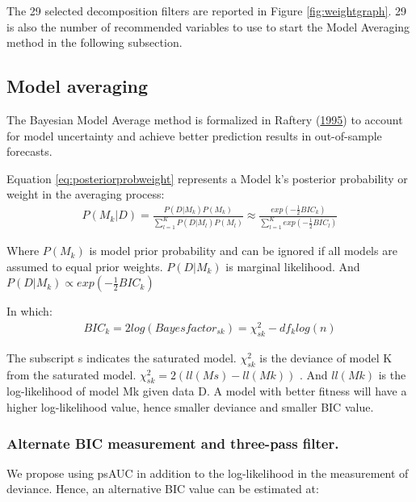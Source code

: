 \documentclass[
  12pt,
]{article}
\begin{document}
The 29 selected decomposition filters are reported in Figure \ref{fig:weightgraph}. 29 is also the number of recommended variables to use to start the Model Averaging method in the following subsection.

\hypertarget{model-average}{%
\subsection{Model averaging}\label{model-average}}

The Bayesian Model Average method is formalized in Raftery (\protect\hyperlink{ref-raftery_bayesian_1995}{1995}) to account for model uncertainty and achieve better prediction results in out-of-sample forecasts.

Equation \eqref{eq:posteriorprobweight} represents a Model k's posterior probability or weight in the averaging process:
\begin{align} \label{eq:posteriorprobweight}
  P(M_k|D) = \frac{P(D|M_k)P(M_k)}{\sum\nolimits_{l=1}^K P(D|M_l)P(M_l)} 
  \approx \frac{exp(-\frac{1}{2}BIC_k)}{\sum\nolimits_{l=1}^K exp(-\frac{1}{2}BIC_l)}
\end{align}

Where \(P(M_k)\) is model prior probability and can be ignored if all models are assumed to equal prior weights. \(P(D|M_k)\) is marginal likelihood. And \(P(D|M_k) \propto exp(-\frac{1}{2}BIC_k)\)

In which:
\begin{align} \label{eq:BIC-lik}
BIC_k = 2log (Bayesfactor_{sk}) = \chi^2_{sk} - df_klog(n)
\end{align}

The subscript s indicates the saturated model. \(\chi^2_{sk}\) is the deviance of model K from the saturated model. \(\chi^2_{sk} = 2(ll(Ms) - ll(Mk))\) . And \(ll(Mk)\) is the log-likelihood of model Mk given data D. A model with better fitness will have a higher log-likelihood value, hence smaller deviance and smaller BIC value.

\hypertarget{alternate-bic-measurement-and-three-pass-filter.}{%
\subsubsection{Alternate BIC measurement and three-pass filter.}\label{alternate-bic-measurement-and-three-pass-filter.}}

We propose using psAUC in addition to the log-likelihood in the measurement of deviance. Hence, an alternative BIC value can be estimated at:
\end{document}
